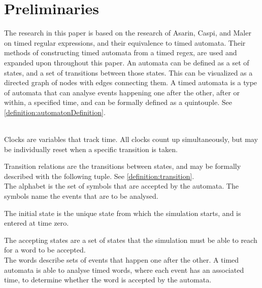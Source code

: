 \section{Preliminaries}






The research in this paper is based on the research of Asarin, Caspi, and Maler\cite{Eugene2001} on timed regular expressions, and their equivalence to timed automata. Their methods of constructing timed automata from a timed regex, are used and expanded upon throughout this paper.
An automata can be defined as a set of states, and a set of transitions between those states. This can be visualized as a directed graph of nodes with edges connecting them.
A timed automata is a type of automata that can analyse events happening one after the other, after or within, a specified time, and can be formally defined as a quintouple\cite{ALUR1994}. See \cref{definition:automatonDefinition}.

\\

Clocks are variables that track time. All clocks count up simultaneously, but may be individually reset when a specific transition is taken.

Transition relations are the transitions between states, and may be formally described with the following tuple. See \cref{definition:transition}.
\\

The alphabet is the set of symbols that are accepted by the automata. The symbols name the events that are to be analysed.

The initial state is the unique state from which the simulation starts, and is entered at time zero.

The accepting states are a set of states that the simulation must be able to reach for a word to be accepted.\\

The words describe sets of events that happen one after the other. A timed automata is able to analyse timed words, where each event has an associated time, to determine whether the word is accepted by the automata.


